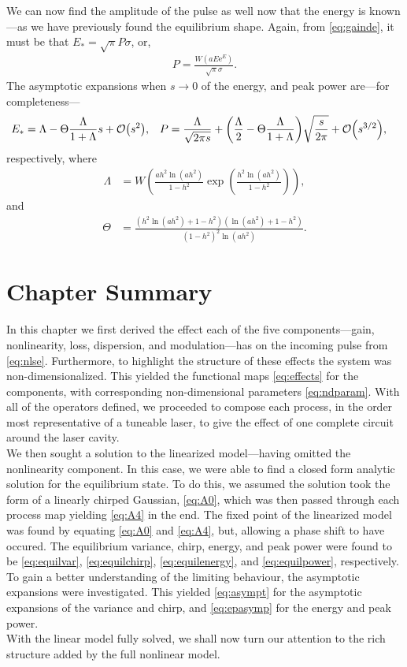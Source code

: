 We can now find the amplitude of the pulse as well now that the energy is known---as we have previously found the equilibrium shape. Again, from \eqref{eq:gainde}, it must be that $E_* = \sqrt{\pi} P \sigma$, or,
\begin{align}
P = \frac{W(a E \textrm{e}^E)}{\sqrt{\pi} \sigma}.
\label{eq:equilpower}
\end{align}
The asymptotic expansions when $s \rightarrow 0$ of the energy, and peak power are---for completeness---
\begin{align}
E_* &= \Lambda - \Theta \frac{\Lambda}{1 + \Lambda} s + \bigO{s^2}, & P &= \frac{\Lambda}{\sqrt{2 \pi s}} + \left( \frac{\Lambda}{2} -  \Theta \frac{\Lambda}{1 + \Lambda} \right) \sqrt{\frac{s}{2 \pi}} +  \bigO{s^{3/2}},
\label{eq:epasymp}
\end{align}
respectively, where
\begin{align*}
\Lambda &= W\left( \frac{a h^2 \ln(a h^2)}{1 - h^2} \exp \left( \frac{h^2 \ln(a h^2)}{1 - h^2} \right) \right),
\end{align*}
and
\begin{align*}
\Theta &= \frac{\left( h^2 \ln(a h^2) + 1 - h^2 \right) \left( \ln(a h^2) + 1 - h^2 \right)}{\left( 1 - h^2 \right)^2 \ln(a h^2)}.
\end{align*}

\section{Chapter Summary}
In this chapter we first derived the effect each of the five components---gain, nonlinearity, loss, dispersion, and modulation---has on the incoming pulse from \eqref{eq:nlse}. Furthermore, to highlight the structure of these effects the system was non-dimensionalized. This yielded the functional maps \eqref{eq:effects} for the components, with corresponding non-dimensional parameters \eqref{eq:ndparam}. With all of the operators defined, we proceeded to compose each process, in the order most representative of a tuneable laser, to give the effect of one complete circuit around the laser cavity. \\

We then sought a solution to the linearized model---having omitted the nonlinearity component. In this case, we were able to find a closed form analytic solution for the equilibrium state. To do this, we assumed the solution took the form of a linearly chirped Gaussian, \eqref{eq:A0}, which was then passed through each process map yielding \eqref{eq:A4} in the end. The fixed point of the linearized model was found by equating \eqref{eq:A0} and \eqref{eq:A4}, but, allowing a phase shift to have occured. The equilibrium variance, chirp, energy, and peak power were found to be \eqref{eq:equilvar}, \eqref{eq:equilchirp}, \eqref{eq:equilenergy}, and \eqref{eq:equilpower}, respectively. To gain a better understanding of the limiting behaviour, the asymptotic expansions were investigated. This yielded \eqref{eq:asympt} for the asymptotic expansions of the variance and chirp, and \eqref{eq:epasymp} for the energy and peak power. \\

With the linear model fully solved, we shall now turn our attention to the rich structure added by the full nonlinear model. \\